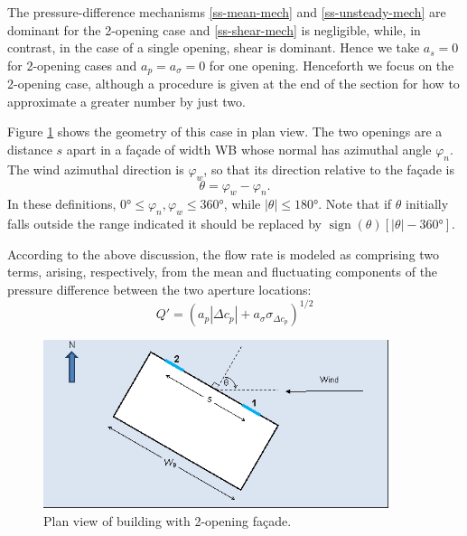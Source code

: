 The pressure-difference mechanisms \ref{ss-mean-mech} and \ref{ss-unsteady-mech} are
dominant for the 2-opening case and \ref{ss-shear-mech} is negligible, while, in
contrast, in the case of a single opening, shear is dominant. Hence we take $a_s=0$ for
2-opening cases and $a_p = a_\sigma = 0$ for one opening. Henceforth we focus on the
2-opening case, although a procedure is given at the end of the section for how to
approximate a greater number by just two.

Figure \ref{fig:ss-plan-view-two-openings} shows the geometry of this case in plan view.
The two openings are a distance $s$ apart in a fa\c{c}ade of width WB whose normal has
azimuthal angle $\varphi_n$. The wind azimuthal direction is $\varphi_w$, so that its
direction relative to the fa\c{c}ade is 
\begin{equation}
\theta=\varphi_w-\varphi_n.
\end{equation}
In these definitions, $\ang{0} \leq \varphi_n, \varphi_w \leq \ang{360}$, while
$|\theta| \leq \ang{180}$. Note that if $\theta$ initially falls outside the range
indicated it should be replaced by $\operatorname{sign}(\theta) \left[|\theta| - \ang{360}\right]$.

According to the above discussion, the flow rate is modeled as comprising two terms,
arising, respectively, from the mean and fluctuating components of the pressure
difference between the two aperture locations:
\begin{equation}\label{eqn:ss-flow-two-terms}
Q'=\left(a_p |\Delta c_p |+a_\sigma \sigma_{\Delta c_p} \right)^{1/2}
\end{equation}

\begin{figure}[hbtp] %
\centering
\includegraphics[width=0.9\textwidth, height=0.9\textheight, keepaspectratio=true]{media/ss-figure1.png}
\caption{Plan view of building with 2-opening fa\c{c}ade. \protect \label{fig:ss-plan-view-two-openings}}
\end{figure}

